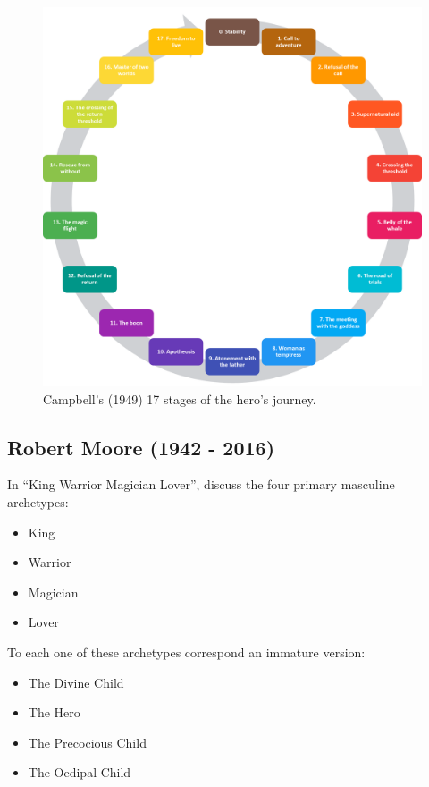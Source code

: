 \documentclass[
]{book}
\providecommand{\tightlist}{%
  \setlength{\itemsep}{0pt}\setlength{\parskip}{0pt}}
\begin{document}
\begin{figure}

{\centering \includegraphics[width=\textwidth]{img/monomyth} 

}

\caption{Campbell's (1949) 17 stages of the hero's journey.}\label{fig:unnamed-chunk-9}
\end{figure}

\hypertarget{robert-moore-1942---2016}{%
\subsection{Robert Moore (1942 - 2016)}\label{robert-moore-1942---2016}}

In ``King Warrior Magician Lover'', \citet{moore1991king} discuss the four primary masculine archetypes:

\begin{itemize}
\tightlist
\item
  King
\item
  Warrior
\item
  Magician
\item
  Lover
\end{itemize}

To each one of these archetypes correspond an immature version:

\begin{itemize}
\tightlist
\item
  The Divine Child
\item
  The Hero
\item
  The Precocious Child
\item
  The Oedipal Child
\end{itemize}
\end{document}
